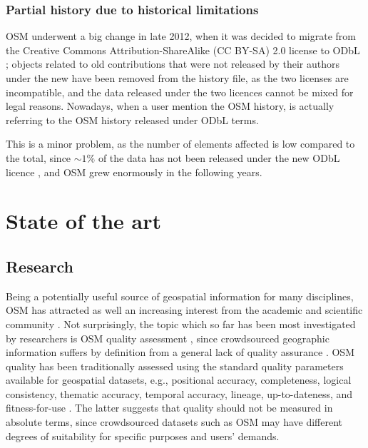 \documentclass{Configuration_Files/PoliMi3i_thesis}
\begin{document}
\subsection{Partial history due to historical limitations}

OSM underwent a big change in late 2012, when it was decided to migrate from the Creative Commons Attribution-ShareAlike (CC BY-SA) 2.0 license \cite{CreativeCommonsAttributionShareAlike} to ODbL \cite{OpenDataCommons}; objects related to old contributions that were not released by their authors under the new have been removed from the history file, as the two licenses are incompatible, and the data released under the two licences cannot be mixed for legal reasons. Nowadays, when a user mention the OSM history, is actually referring to the OSM history released under ODbL terms.

This is a minor problem, as the number of elements affected is low compared to the total, since $ \sim 1 \% $ of the data has not been released under the new ODbL licence \cite{OpenDatabaseLicense}, and OSM grew enormously in the following years.

\chapter{State of the art}
\label{ch:state_of_the_art}%

\section{Research}

Being a potentially useful source of geospatial information for many disciplines, OSM has attracted as well an increasing interest from the academic and scientific community \cite{jokararsanjaniIntroductionOpenStreetMapGeographic2015}. Not surprisingly, the topic which so far has been most investigated by researchers is OSM quality assessment \cite{sehraUsingLatentSemantic2017}, since crowdsourced geographic information suffers by definition from a general lack of quality assurance \cite{goodchildAssuringQualityVolunteered2012}. OSM quality has been traditionally assessed using the standard quality parameters available for geospatial datasets, e.g., positional accuracy, completeness, logical consistency, thematic accuracy, temporal accuracy, lineage, up-to-dateness, and fitness-for-use \cite{goodchildAssuringQualityVolunteered2012, vereginDataQualityParameters1999, devillersSpatialDataQuality2010, ISO191572013}. The latter suggests that quality should not be measured in absolute terms, since crowdsourced datasets such as OSM may have different degrees of suitability for specific purposes and users' demands.
\end{document}
